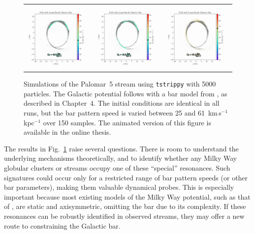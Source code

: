 \begin{figure}
\begin{tabular}{ccc}
                \includegraphics[width=.32\linewidth]{images/frame_0065.png}&
                \includegraphics[width=.32\linewidth]{images/frame_0066.png}&
                \includegraphics[width=.32\linewidth]{images/frame_0104.png}\\
            \end{tabular}
            \caption[The presence of a stellar bar with different rotational speeds affecting the Palomar~5 stream]{Simulations of the Palomar~5 stream using \texttt{tstrippy} with 5000 particles. The Galactic potential follows \citet{2017A&A...598A..66P} with a bar model from \citet{1997MNRAS.291..717M}, as described in Chapter~4. The initial conditions are identical in all runs, but the bar pattern speed is varied between 25 and 61~km\,s$^{-1}$\,kpc$^{-1}$ over 150 samples. The animated version of this figure is available in the online thesis.}
            \label{fig:pal5_with_bar}
        \end{figure}

        The results in Fig.~\ref{fig:pal5_with_bar} raise several questions. There is room to understand the underlying mechanisms theoretically, and to identify whether any Milky Way globular clusters or streams occupy one of these ``special'' resonances. Such signatures could occur only for a restricted range of bar pattern speeds (or other bar parameters), making them valuable dynamical probes. This is especially important because most existing models of the Milky Way potential, such as that of \citet{2024ApJ...967...89I}, are static and axisymmetric, omitting the bar due to its complexity. If these resonances can be robustly identified in observed streams, they may offer a new route to constraining the Galactic bar.

